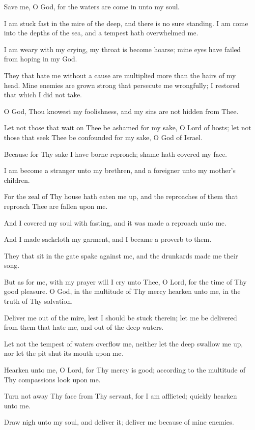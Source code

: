 Save me, O God, for the waters are come in unto my soul.

I am stuck fast in the mire of the deep, and there is no sure standing. I am come into the depths of the sea, and a tempest hath overwhelmed me.

I am weary with my crying, my throat is become hoarse; mine eyes have failed from hoping in my God.

They that hate me without a cause are multiplied more than the hairs of my head. Mine enemies are grown strong that persecute me wrongfully; I restored that which I did not take.

O God, Thou knowest my foolishness, and my sins are not hidden from Thee.

Let not those that wait on Thee be ashamed for my sake, O Lord of hosts; let not those that seek Thee be confounded for my sake, O God of Israel.

Because for Thy sake I have borne reproach; shame hath covered my face.

I am become a stranger unto my brethren, and a foreigner unto my mother's children.

For the zeal of Thy house hath eaten me up, and the reproaches of them that reproach Thee are fallen upon me.

And I covered my soul with fasting, and it was made a reproach unto me.

And I made sackcloth my garment, and I became a proverb to them.

They that sit in the gate spake against me, and the drunkards made me their song.

But as for me, with my prayer will I cry unto Thee, O Lord, for the time of Thy good pleasure. O God, in the multitude of Thy mercy hearken unto me, in the truth of Thy salvation.

Deliver me out of the mire, lest I should be stuck therein; let me be delivered from them that hate me, and out of the deep waters.

Let not the tempest of waters overflow me, neither let the deep swallow me up, nor let the pit shut its mouth upon me.

Hearken unto me, O Lord, for Thy mercy is good; according to the multitude of Thy compassions look upon me.

Turn not away Thy face from Thy servant, for I am afflicted; quickly hearken unto me.

Draw nigh unto my soul, and deliver it; deliver me because of mine enemies.

